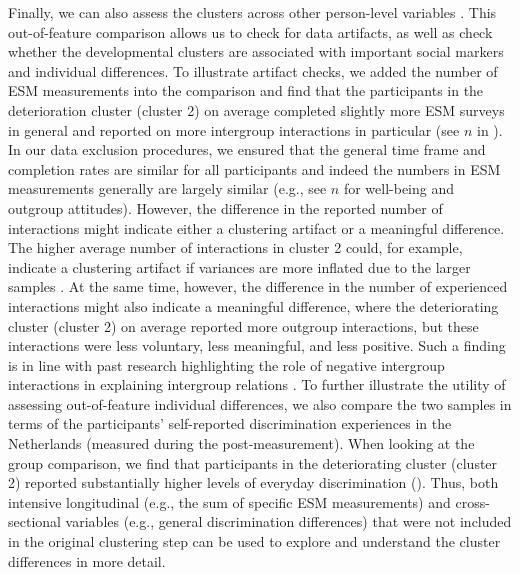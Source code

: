 Finally, we can also assess the clusters across other person-level
variables \citep[e.g.,][]{monden2022}. This out-of-feature comparison
allows us to check for data artifacts, as well as check whether the
developmental clusters are associated with important social markers and
individual differences. To illustrate artifact checks, we added the
number of ESM measurements into the comparison and find that the
participants in the deterioration cluster (cluster 2) on average
completed slightly more ESM surveys in general and reported on more
intergroup interactions in particular (see \(n\) in
). In our data exclusion procedures, we
ensured that the general time frame and completion rates are similar for
all participants and indeed the numbers in ESM measurements generally
are largely similar (e.g., see \(n\) for well-being and outgroup
attitudes). However, the difference in the reported number of
interactions might indicate either a clustering artifact or a meaningful
difference. The higher average number of interactions in cluster 2
could, for example, indicate a clustering artifact if variances are more
inflated due to the larger samples \citep{kogan2006}. At the same time,
however, the difference in the number of experienced interactions might
also indicate a meaningful difference, where the deteriorating cluster
(cluster 2) on average reported more outgroup interactions, but these
interactions were less voluntary, less meaningful, and less positive.
Such a finding is in line with past research highlighting the role of
negative intergroup interactions in explaining intergroup relations
\citep[e.g.,][]{Barlow2012, Prati2021, Graf2014}. To further illustrate
the utility of assessing out-of-feature individual differences, we also
compare the two samples in terms of the participants' self-reported
discrimination experiences in the Netherlands (measured during the
post-measurement). When looking at the group comparison, we find that
participants in the deteriorating cluster (cluster 2) reported
substantially higher levels of everyday discrimination
(). Thus, both intensive longitudinal
(e.g., the sum of specific ESM measurements) and cross-sectional
variables (e.g., general discrimination differences) that were not
included in the original clustering step can be used to explore and
understand the cluster differences in more detail.

